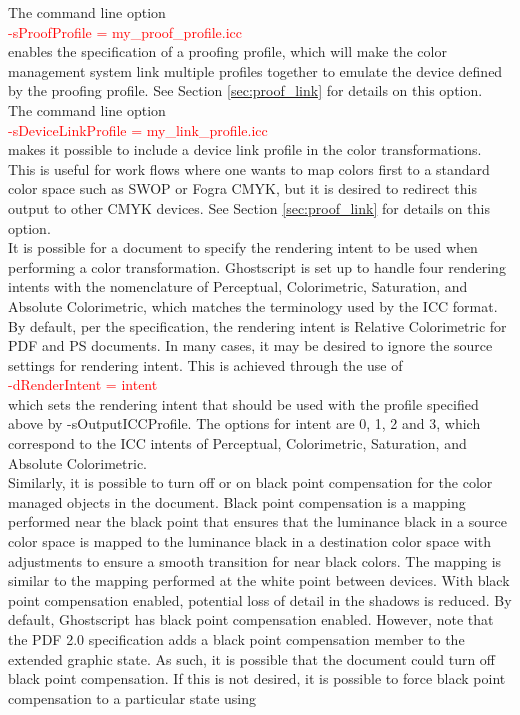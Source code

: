 \documentclass[12pt,notitlepage]{article}
\begin{document}
The command line option\\

\textcolor{red}{-sProofProfile = my\_proof\_profile.icc}\\

\noindent enables the specification of a proofing profile, which will make the color management system link multiple profiles together to emulate the device defined by the proofing profile.  See Section \ref{sec:proof_link} for details on this option.\\

The command line option\\

\textcolor{red}{-sDeviceLinkProfile = my\_link\_profile.icc}\\

 \noindent makes it possible to include a device link profile in the color transformations.  This is useful for work flows where one wants to map colors first to a standard color space such as SWOP or Fogra CMYK, but it is desired to redirect this output to other CMYK devices. See Section \ref{sec:proof_link} for details on this option.\\

It is possible for a document to specify the rendering intent to be used when performing a color transformation.  Ghostscript is set up to handle four rendering intents with the nomenclature of Perceptual, Colorimetric, Saturation, and Absolute Colorimetric, which matches the terminology used by the ICC format.  By default, per the specification, the rendering intent is Relative Colorimetric for PDF and PS documents.  In many cases, it may be desired to ignore the source settings for rendering intent.  This is achieved through the use of\\

\textcolor{red}{-dRenderIntent = intent}\\

\noindent which sets the rendering intent that should be used with the profile specified above by -sOutputICCProfile. The options for intent are 0, 1, 2 and 3, which correspond to the ICC intents of Perceptual, Colorimetric, Saturation, and Absolute Colorimetric.\\

Similarly, it is possible to turn off or on black point compensation for the color managed objects in the document.  Black point compensation is a mapping performed near the black point that ensures that the luminance black in a source color space is mapped to the luminance black in a destination color space with adjustments to ensure a smooth transition for near black colors.  The mapping is similar to the mapping performed at the white point between devices. With black point compensation enabled, potential loss of detail in the shadows is reduced.   By default, Ghostscript has black point compensation  enabled.  However, note that the PDF 2.0 specification adds a black point compensation member to the extended graphic state.  As such, it is possible that the document could turn off black point compensation.   If this is not desired, it is possible to force black point compensation to a particular state using\\
\end{document}
